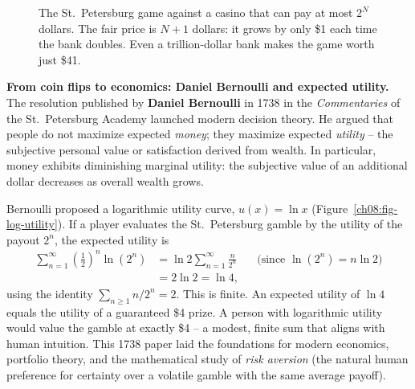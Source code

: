 \begin{figure}[H]
\centering
{}
\caption{The St.\ Petersburg game against a casino that can pay at most
$2^N$ dollars. The fair price is $N+1$ dollars: it grows by only \$1 each time
the bank doubles. Even a trillion-dollar bank makes the game worth just \$41.}
\label{ch08:fig-stpete-cap}
\end{figure}

\begin{connectionbox}
\textbf{From coin flips to economics: Daniel Bernoulli and expected utility.}
The resolution published by \textbf{Daniel Bernoulli} in 1738 in the
\emph{Commentaries} of the St.\ Petersburg Academy launched modern decision
theory. He argued that people do not maximize expected \emph{money}; they
maximize expected \emph{utility} -- the subjective personal value or satisfaction
derived from wealth. In particular, money exhibits diminishing marginal utility:
the subjective value of an additional dollar decreases as overall wealth grows.

Bernoulli proposed a logarithmic utility curve, $u(x) = \ln x$
(Figure~\ref{ch08:fig-log-utility}). If a player
evaluates the St.\ Petersburg gamble by the utility of the payout $2^n$, the
expected utility is
\begin{align*}
  \sum_{n=1}^\infty \left(\tfrac12\right)^n \ln(2^n)
    &= \ln 2 \sum_{n=1}^\infty \frac{n}{2^n} && \text{(since $\ln(2^n) = n\ln 2$)}\\
    &= 2\ln 2 = \ln 4,
\end{align*}
using the identity $\sum_{n\ge1} n/2^n = 2$. This is finite. An expected utility of $\ln 4$
equals the utility of a guaranteed \$4 prize. A person with logarithmic utility
would value the gamble at exactly \$4 -- a modest, finite sum that aligns with
human intuition. This 1738 paper laid the foundations for modern economics,
portfolio theory, and the mathematical study of \emph{risk aversion} (the
natural human preference for certainty over a volatile gamble with the same
average payoff).
\end{connectionbox}

